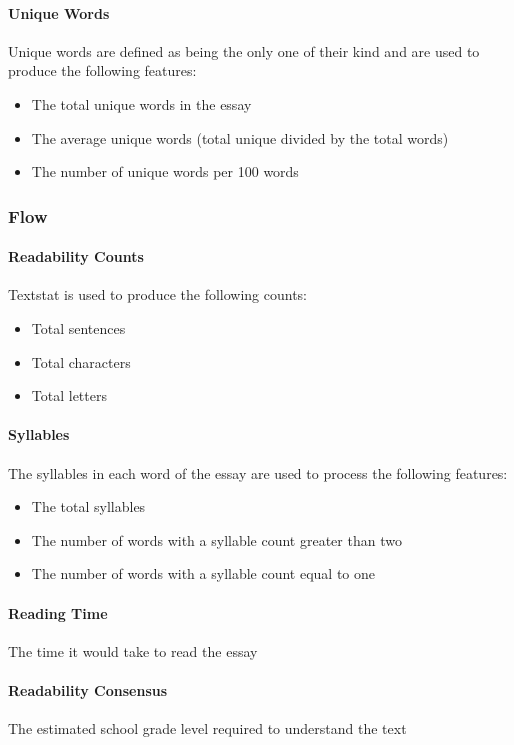 \paragraph{Unique Words}
Unique words are defined as being the only one of their kind and are used to produce the following features:
\begin{itemize}
 \item The total unique words in the essay
 \item The average unique words (total unique divided by the total words)
 \item The number of unique words per 100 words
\end{itemize}

\subsubsection{Flow}
\paragraph{Readability Counts} Textstat is used to produce the following counts:
\begin{itemize}
 \item Total sentences
 \item Total characters
 \item Total letters 
\end{itemize}

\paragraph{Syllables} The syllables in each word of the essay are used to process the following features:
\begin{itemize}
 \item The total syllables
 \item The number of words with a syllable count greater than two
 \item The number of words with a syllable count equal to one
\end{itemize}

\paragraph{Reading Time}The time it would take to read the essay

\paragraph{Readability Consensus}The estimated school grade level required to understand the text 

